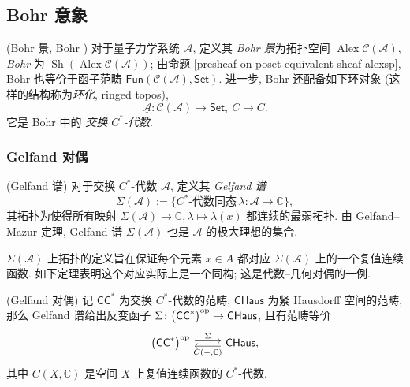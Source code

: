 %

\subsection{Bohr 意象}


\begin{definition}
    {(Bohr 景, Bohr \topos{})}
    对于量子力学系统 $\mathcal A$, 定义其 \emph{Bohr 景}为拓扑空间 $\operatorname{Alex}\mathcal C(\mathcal A)$, \emph{Bohr \topos{}}为 $\operatorname{Sh}(\operatorname{Alex}\mathcal C(\mathcal A))$; 由命题 \ref{presheaf-on-poset-equivalent-sheaf-alexsp}, Bohr \topos{}也等价于函子范畴 $\mathsf {Fun}(\mathcal C(\mathcal A),\mathsf {Set})$.
	进一步, Bohr \topos{}还配备如下环对象 (这样的结构称为\emph{环化\topos{}}, ringed topos),
	$$
	\underline{\mathcal A} \colon \mathcal C(\mathcal A)\to \mathsf {Set} ,\ C\mapsto C.
	$$
	它是 Bohr \topos{}中的 \emph{交换 $C^*$-代数}.
\end{definition}

\subsubsection{Gelfand 对偶}

\begin{definition}
    {(Gelfand 谱)}
    对于交换 $C^*$-代数 $\mathcal A$, 定义其 \emph{Gelfand 谱}
$$
\Sigma(\mathcal A) := \{C^*\text{-代数同态}\,\lambda\colon \mathcal A \to\mathbb{C}\},
$$
其拓扑为使得所有映射 $\Sigma(\mathcal A)\to\mathbb{C}, \lambda \mapsto \lambda (x)$ 都连续的最弱拓扑. 由 Gelfand--Mazur 定理, Gelfand 谱 $\Sigma(\mathcal A)$ 也是 $\mathcal A$ 的极大理想的集合.
\end{definition}

$\Sigma(\mathcal A)$ 上拓扑的定义旨在保证每个元素 $x\in A$ 都对应 $\Sigma(\mathcal A)$ 上的一个复值连续函数. 如下定理表明这个对应实际上是一个同构; 这是代数--几何对偶的一例.

\begin{prop}
    {(Gelfand 对偶)}
    记 $\mathsf {CC}^*$ 为交换 $C^*$-代数的范畴, $\mathsf{CHaus}$ 为紧 Hausdorff 空间的范畴,
    那么 Gelfand 谱给出反变函子 $\Sigma\colon \big(\mathsf {CC}^*\big)^{\text{op}} \to \mathsf {CHaus}$, 且有范畴等价
    \[\begin{tikzcd}[ampersand replacement=\&]
    	{\big(\mathsf {CC}^*\big)^{\op}} \& {\mathsf {CHaus},}
    	\arrow["\Sigma", shift left, from=1-1, to=1-2]
    	\arrow["{C({-},\mathbb{C})}", shift left, from=1-2, to=1-1]
    \end{tikzcd}\]
    其中 $C(X,\mathbb{C})$ 是空间 $X$ 上复值连续函数的 $C^*$-代数.
\end{prop}

